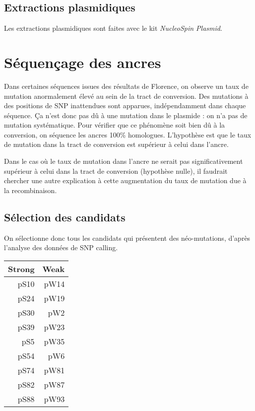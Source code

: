 \documentclass[a4paper, justified]{tufte-handout}
\begin{document}
\subsection{Extractions plasmidiques}
\label{sec:orgheadline3}
Les extractions plasmidiques sont faites avec le kit \emph{NucleoSpin Plasmid}. 


\section{Séquençage des ancres}
\label{sec:orgheadline6}
Dans certaines séquences issues des résultats de Florence, on observe un taux de
mutation anormalement élevé au sein de la tract de conversion. Des mutations à
des positions de SNP inattendues sont apparues, indépendamment dans chaque
séquence. Ça n'est donc pas dû à une mutation dans le plasmide : on n'a pas de
mutation systématique. Pour vérifier que ce phénomène soit bien dû à la
conversion, on séquence les ancres 100\% homologues. L'hypothèse est que le taux
de mutation dans la tract de conversion est supérieur à celui dans l'ancre.

Dans le cas où le taux de mutation dans l'ancre ne serait pas significativement
supérieur à celui dans la tract de conversion (hypothèse nulle), il faudrait
chercher une autre explication à cette augmentation du taux de mutation due à la
recombinaison. 

\subsection{Sélection des candidats}
\label{sec:orgheadline5}
On sélectionne donc tous les candidats qui présentent des néo-mutations, d'après
l'analyse des données de SNP calling. 

\begin{margintable}
  \begin{center}
    \ttfamily
    \begin{tabular}{rr}
      \toprule
      \textbf{Strong} & \textbf{Weak} \\
      \midrule
      pS10 & pW14 \\
      pS24 & pW19 \\
      pS30 & pW2 \\
      pS39 & pW23 \\
      pS5  & pW35 \\
      pS54 & pW6 \\
      pS74 & pW81 \\
      pS82 & pW87 \\
      pS88 & pW93 \\
      \bottomrule
    \end{tabular}
  \end{center}
\end{margintable}
\end{document}
